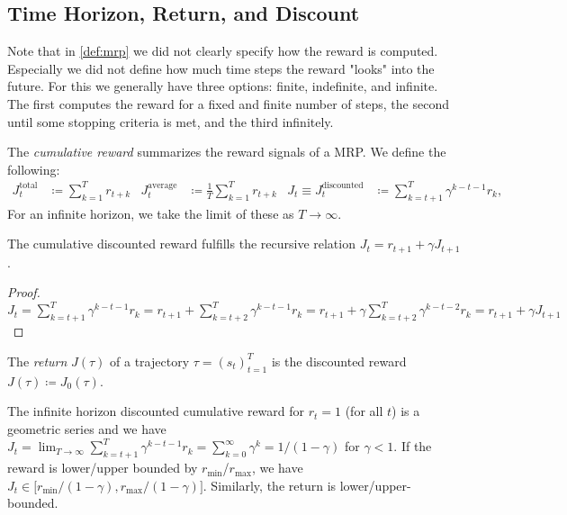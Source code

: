 		\subsection{Time Horizon, Return, and Discount}
			Note that in \autoref{def:mrp} we did not clearly specify how the reward is computed. Especially we did not define how much time steps the reward "looks" into the future. For this we generally have three options: finite, indefinite, and infinite. The first computes the reward for a fixed and finite number of steps, the second until some stopping criteria is met, and the third infinitely.

			\begin{definition}
				The \emph{cumulative reward} summarizes the reward signals of a \ac{MRP}. We define the following:
				\begin{align}
					J_t^\mathrm{total}                 & \coloneqq \sum_{k = 1}^{T} r_{t + k}                   &
					J_t^\mathrm{average}               & \coloneqq \frac{1}{T} \sum_{k = 1}^{T} r_{t + k}       &
					J_t \equiv J_t^\mathrm{discounted} & \coloneqq \sum_{k = t + 1}^{T} \gamma^{k - t - 1} r_k,
				\end{align}
				For an infinite horizon, we take the limit of these as \(T \to \infty\).
			\end{definition}
			\begin{theorem}
				The cumulative discounted reward fulfills the recursive relation \( J_t = r_{t + 1} + \gamma J_{t + 1} \).
			\end{theorem}
			\begin{proof}
				\(
				J_t = \sum_{k = t + 1}^{T} \gamma^{k - t - 1} r_k
				= r_{t + 1} + \sum_{k = t + 2}^{T} \gamma^{k - t - 1} r_k
				= r_{t + 1} + \gamma \sum_{k = t + 2}^{T} \gamma^{k - t - 2} r_k
				= r_{t + 1} + \gamma J_{t + 1}
				\)
			\end{proof}
			\begin{definition}[Return]
				The \emph{return} \(J(\tau)\) of a trajectory \( \tau = (s_t)_{t = 1}^{T} \) is the discounted reward \( J(\tau) \coloneqq J_0(\tau) \).
			\end{definition}
			\begin{remark}
				The infinite horizon discounted cumulative reward for \(r_t = 1\) (for all \(t\)) is a geometric series and we have \( J_t = \lim_{T \to \infty} \sum_{k = t + 1}^{T} \gamma^{k - t - 1} r_k = \sum_{k = 0}^{\infty} \gamma^k = 1/(1 - \gamma) \) for \(\gamma < 1\). If the reward is lower/upper bounded by \(r_\mathrm{min}\)/\(r_\mathrm{max}\), we have \( J_t \in \bigl[ r_\mathrm{min}/(1 - \gamma), r_\mathrm{max}/(1 - \gamma) \bigr] \). Similarly, the return is lower/upper-bounded.
			\end{remark}

